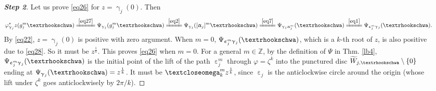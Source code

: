 \documentclass[11pt,b5paper,notitlepage]{article}
\theoremstyle{definition}
\theoremstyle{plain}
\newcommand{\wtd}{\widetilde}
\newcommand{\Zbb}{\mathbb Z}
\newcommand{\tipaomega}{\text{\textcloseomega}}
\newcommand{\tipae}{\text{\textrhookschwa}}
\numberwithin{equation}{subsection}
\begin{document}
\begin{proof}[\textbf{Step 2}]
Let us prove \eqref{eq26} for $z=\upgamma_j(0)$. Then
\begin{align*}
\varphi^*_{\upgamma_j}z(g_j^m\tipae)\xlongequal{\eqref{eq27}} \Psi_{\upgamma_j}(g_j^m\tipae)	\xlongequal{\eqref{eq2}}\Psi_{\upgamma_j}([\upalpha_j]^m\tipae)\xlongequal{\eqref{eq7}}\Psi_{\upgamma_j\upalpha_j^m}(\tipae)\xlongequal{\eqref{eq1}}\Psi_{\upepsilon_j^m\upgamma_j}(\tipae).
\end{align*}
By \eqref{eq22}, $z=\upgamma_j(0)$ is positive with zero argument. When $m=0$, $\Psi_{\upepsilon_j^m\upgamma_j}(\tipae)$, which is a $k$-th root of $z$, is also positive due to \eqref{eq28}. So it must be $z^{\frac 1k}$. This proves \eqref{eq26} when $m=0$. For a general $m\in\Zbb$, by the definition of $\Psi$ in Thm. \ref{lb4}, $\Psi_{\upepsilon_j^m\upgamma_j}(\tipae)$ is the initial point of the lift of the path $\upepsilon_j^m$ through $\varphi=\zeta^k$ into the punctured disc $\wtd W_{j,\tipae}\setminus \{0\}$ ending at $\Psi_{\upgamma_j}(\tipae)=z^{\frac 1k}$. It must be $\tipaomega_k^mz^{\frac 1{k}}$, since $\upepsilon_j$ is the anticlockwise circle around the origin (whose lift under $\zeta^k$ goes anticlockwisely by $2\pi/k$).
\end{proof}
\end{document}
